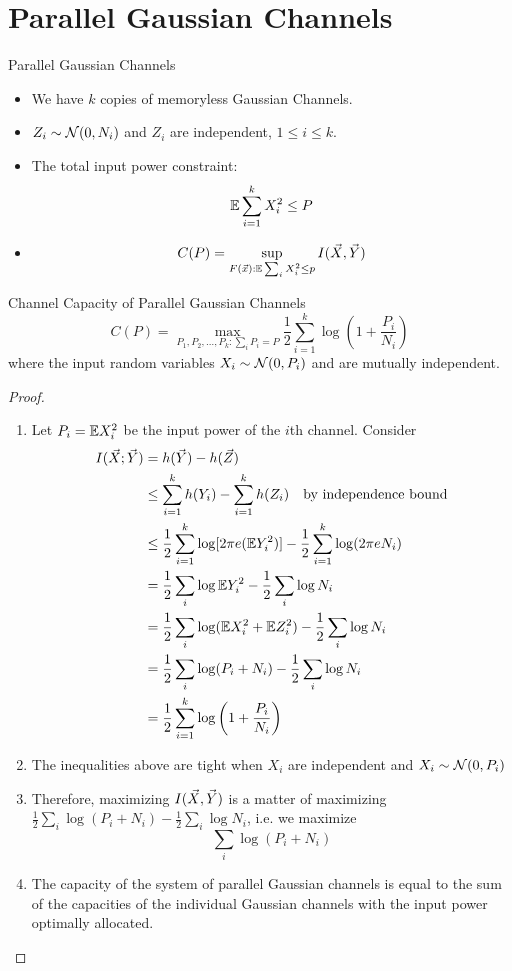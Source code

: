 \documentclass[../main.tex]{subfiles}
\begin{document}
\section{Parallel Gaussian Channels}
\begin{gbox}{Parallel Gaussian Channels}
    \begin{itemize}
        \item We have $k$ copies of memoryless Gaussian Channels.
        \item $Z_i\sim \mathcal{N}(0,N_i)$ and $Z_i$ are independent, $1\leq i\leq k$.
        \item The total input power constraint: \[
            \mathbb{E} \sum_{i=1}^k X_i^2 \leq P
        \]
        \item \[
        C(P) = \sup_{F(\vec x):\mathbb{E} \sum_i X_i^2\leq p}I(\vec X,\vec Y)
        \]
    \end{itemize}
\end{gbox}
\begin{bbox}{Channel Capacity of Parallel Gaussian Channels}
        \[
        C(P) = \max_{P_1,P_2,\dots,P_k:\sum_i P_i=P}\frac{1}{2}\sum_{i=1}^k\log(1+\frac{P_i}{N_i})
        \] where the input random variables $X_i\sim\mathcal{N}(0,P_i)$ and are mutually independent.
        \begin{proof}
        \begin{enumerate}
            \item Let $P_i=\mathbb{E} X_i^2$ be the input power of the $i$th channel. Consider \begin{align*}
                I(\vec X;\vec Y) &= h(\vec Y)-h(\vec Z)\\
                &\leq \sum_{i=1}^kh(Y_i) - \sum_{i=1}^kh(Z_i) \quad\text{by independence bound}\\
                &\leq \frac{1}{2}\sum_{i=1}^k\log[2\pi e(\mathbb{E} Y_i^2)]-\frac{1}{2}\sum_{i=1}^k\log(2\pi eN_i)\\
                &=\frac{1}{2}\sum_i\log \mathbb{E} Y_i^2 -\frac{1}{2}\sum_i \log N_i \\
                &=\frac{1}{2}\sum_i\log (\mathbb{E} X_i^2 + \mathbb{E} Z_i^2) -\frac{1}{2}\sum_i \log N_i\\
                &= \frac{1}{2}\sum_i\log (P_i + N_i) -\frac{1}{2}\sum_i \log N_i\\
                &=\frac{1}{2}\sum_{i=1}^k\log \left(1+\frac{P_i}{N_i}\right)
            \end{align*}
        \item The inequalities above are tight when $X_i$ are independent and $X_i\sim \mathcal{N}(0,P_i)$
        \item Therefore, maximizing $I(\vec X,\vec Y)$ is a matter of maximizing $\frac{1}{2}\sum_i\log (P_i + N_i) -\frac{1}{2}\sum_i \log N_i$, i.e. we maximize \[
        \sum_i\log (P_i + N_i)
        \]
        \item The capacity of the system of parallel Gaussian channels is equal to the sum of the capacities of the individual Gaussian channels with the input power optimally allocated.
        \end{enumerate}
        \end{proof}
\end{bbox}
\end{document}
